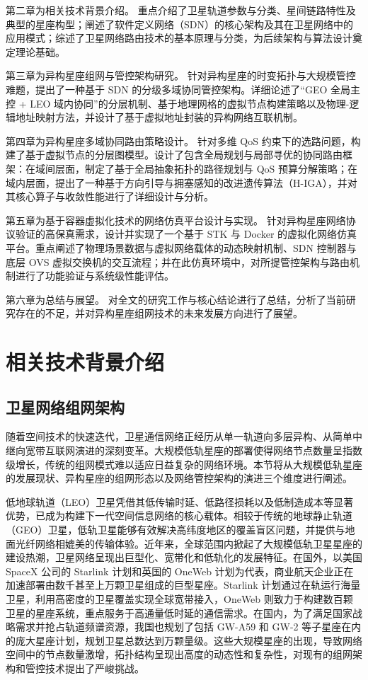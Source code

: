 \documentclass[print, master, vlined]{DissertUESTC}
\begin{document}
    第二章为相关技术背景介绍。 重点介绍了卫星轨道参数与分类、星间链路特性及典型的星座构型；阐述了软件定义网络（SDN）的核心架构及其在卫星网络中的应用模式；综述了卫星网络路由技术的基本原理与分类，为后续架构与算法设计奠定理论基础。
    
    第三章为异构星座组网与管控架构研究。 针对异构星座的时变拓扑与大规模管控难题，提出了一种基于 SDN 的分级多域协同管控架构。详细论述了“GEO 全局主控 + LEO 域内协同”的分层机制、基于地理网格的虚拟节点构建策略以及物理-逻辑地址映射方法，并设计了基于虚拟地址封装的异构网络互联机制。
    
    第四章为异构星座多域协同路由策略设计。 针对多维 QoS 约束下的选路问题，构建了基于虚拟节点的分层图模型。设计了包含全局规划与局部寻优的协同路由框架：在域间层面，制定了基于全局抽象拓扑的路径规划与 QoS 预算分解策略；在域内层面，提出了一种基于方向引导与拥塞感知的改进遗传算法（H-IGA），并对其核心算子与收敛性能进行了详细设计与分析。
    
    第五章为基于容器虚拟化技术的网络仿真平台设计与实现。 针对异构星座网络协议验证的高保真需求，设计并实现了一个基于 STK 与 Docker 的虚拟化网络仿真平台。重点阐述了物理场景数据与虚拟网络载体的动态映射机制、SDN 控制器与底层 OVS 虚拟交换机的交互流程；并在此仿真环境中，对所提管控架构与路由机制进行了功能验证与系统级性能评估。
    
    第六章为总结与展望。 对全文的研究工作与核心结论进行了总结，分析了当前研究存在的不足，并对异构星座组网技术的未来发展方向进行了展望。
    

    \chapter{相关技术背景介绍}
    \section{卫星网络组网架构}
    随着空间技术的快速迭代，卫星通信网络正经历从单一轨道向多层异构、从简单中继向宽带互联网演进的深刻变革。大规模低轨星座的部署使得网络节点数量呈指数级增长，传统的组网模式难以适应日益复杂的网络环境。本节将从大规模低轨星座的发展现状、异构星座的组网形态以及网络管控架构的演进三个维度进行阐述。
    
    低地球轨道（LEO）卫星凭借其低传输时延、低路径损耗以及低制造成本等显著优势，已成为构建下一代空间信息网络的核心载体。相较于传统的地球静止轨道（GEO）卫星，低轨卫星能够有效解决高纬度地区的覆盖盲区问题，并提供与地面光纤网络相媲美的传输体验。近年来，全球范围内掀起了大规模低轨卫星星座的建设热潮，卫星网络呈现出巨型化、宽带化和低轨化的发展特征。在国外，以美国 SpaceX 公司的 Starlink 计划和英国的 OneWeb 计划为代表，商业航天企业正在加速部署由数千甚至上万颗卫星组成的巨型星座。Starlink 计划通过在轨运行海量卫星，利用高密度的卫星覆盖实现全球宽带接入，OneWeb 则致力于构建数百颗卫星的星座系统，重点服务于高通量低时延的通信需求。在国内，为了满足国家战略需求并抢占轨道频谱资源，我国也规划了包括 GW-A59 和 GW-2 等子星座在内的庞大星座计划，规划卫星总数达到万颗量级。这些大规模星座的出现，导致网络空间中的节点数量激增，拓扑结构呈现出高度的动态性和复杂性，对现有的组网架构和管控技术提出了严峻挑战。
\end{document}
